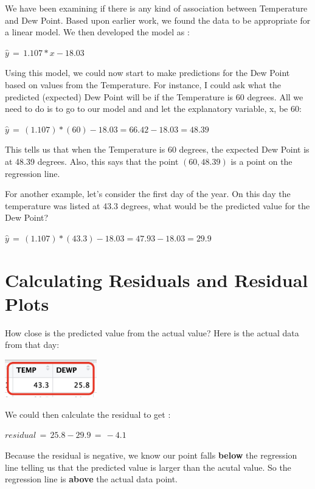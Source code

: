 \documentclass[
  letterpaper,
  DIV=11,
  numbers=noendperiod]{scrreprt}
\begin{document}
We have been examining if there is any kind of association between
Temperature and Dew Point. Based upon earlier work, we found the data to
be appropriate for a linear model. We then developed the model as :

\(\hat{y} \, = \, 1.107*x - 18.03\)

Using this model, we could now start to make predictions for the Dew
Point based on values from the Temperature. For instance, I could ask
what the predicted (expected) Dew Point will be if the Temperature is 60
degrees. All we need to do is to go to our model and and let the
explanatory variable, x, be 60:

\(\hat{y} \, = \, (1.107)*(60) - 18.03 = 66.42 - 18.03 = 48.39\)

This tells us that when the Temperature is 60 degrees, the expected Dew
Point is at 48.39 degrees. Also, this says that the point
\((60, 48.39)\) is a point on the regression line.

For another example, let's consider the first day of the year. On this
day the temperature was listed at 43.3 degrees, what would be the
predicted value for the Dew Point?

\(\hat{y} \, = \, (1.107)*(43.3) - 18.03 = 47.93 - 18.03 = 29.9\)

\section*{Calculating Residuals and Residual
Plots}\label{calculating-residuals-and-residual-plots}


How close is the predicted value from the actual value? Here is the
actual data from that day:

\includegraphics[width=0.3\textwidth,height=\textheight]{./images/ROP_8.jpg}

We could then calculate the residual to get :

\(residual \, = \, 25.8 - 29.9\, = \, -4.1\)

Because the residual is negative, we know our point falls \textbf{below}
the regression line telling us that the predicted value is larger than
the acutal value. So the regression line is \textbf{above} the actual
data point.
\end{document}
